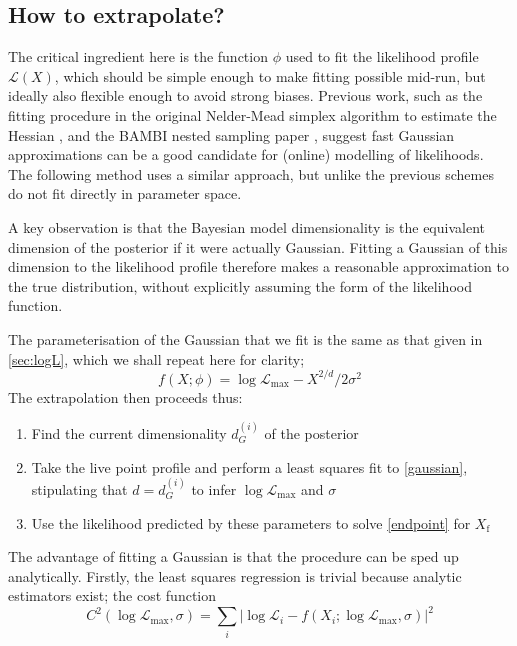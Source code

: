 \documentclass[usenatbib]{mnras}
\newcommand{\Like}{\mathcal{L}}
\newcommand{\logLmax}{\log \Like_\mathrm{max}}
\begin{document}
\subsection{How to extrapolate?}\label{sec:how_to_extrapolate}
The critical ingredient here is the function $\phi$ used to fit the likelihood profile $\Like(X)$, which should be simple enough to make fitting possible mid-run, but ideally also flexible enough to avoid strong biases. 
Previous work, such as the fitting procedure in the original Nelder-Mead simplex algorithm to estimate the Hessian \citep{nelder_mead}, and the BAMBI nested sampling paper \citep{Graff_2012}, suggest fast Gaussian approximations can be a good candidate for (online) modelling of likelihoods. The following method uses a similar approach, but unlike the previous schemes do not fit directly in parameter space.
\par
A key observation is that the Bayesian model dimensionality is the equivalent dimension of the posterior if it were actually Gaussian. Fitting a Gaussian of this dimension to the likelihood profile therefore makes a reasonable approximation to the true distribution, without explicitly assuming the form of the likelihood function. 
\par
The parameterisation of the Gaussian that we fit is the same as that given in \cref{sec:logL}, which we shall repeat here for clarity;
\begin{equation}\label{gaussian}
    f(X; \phi) = \logLmax - X^{2/d}/2\sigma^2
\end{equation}
The extrapolation then proceeds thus:
\begin{enumerate}[leftmargin=*]
    \item Find the current dimensionality ${d}^{(i)}_G$ of the posterior
    \item Take the live point profile and perform a least squares fit to \cref{gaussian}, stipulating that $d = {d}^{(i)}_G$ to infer $\logLmax$ and $\sigma$ 
    \item Use the likelihood predicted by these parameters to solve \cref{endpoint} for $X_\mathrm{f}$
\end{enumerate}
The advantage of fitting a Gaussian is that the procedure can be sped up analytically. Firstly, the least squares regression is trivial because analytic estimators exist; the cost function 
\begin{equation}\label{chi squared}
	C^2(\logLmax, \sigma) = \sum_i \left| \log \Like_i - f(X_i; \logLmax, \sigma) \right| ^2
\end{equation}
\end{document}
